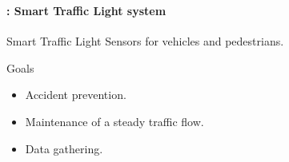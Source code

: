 \documentclass[utf8,xcolor=table, page number]{earlywinter}
\begin{document}
\begin{frame}
  \frametitle{\secname}
  \framesubtitle{\subsecname: Smart Traffic Light system}
  

  \begin{minipage}[l]{0.7\linewidth}
  \begin{block}{Smart Traffic Light}
    Sensors for vehicles and pedestrians.
  \end{block}

  \begin{block}{Goals}
    \begin{itemize}
    \item Accident prevention.
    \item Maintenance of a steady traffic flow.
    \item Data gathering.
    \end{itemize}
  \end{block}
  \end{minipage}
\begin{minipage}[l]{0.2\linewidth}
  \begin{center}

\end{center}
\end{minipage}
\end{frame}
\end{document}
